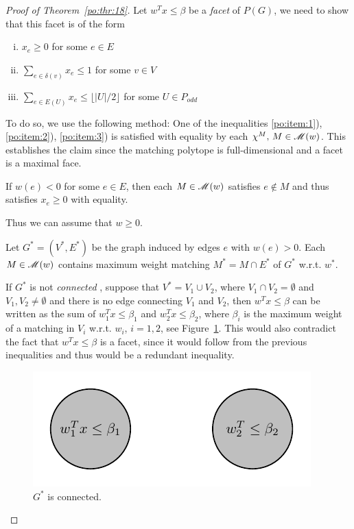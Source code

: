 \begin{proof}[Proof of Theorem~\ref{po:thr:18}]

Let $w^Tx\leq\beta$ be a \emph{facet} of $P(G)$, we need to show 
that this facet is of the form
  \begin{enumerate}[i)]
  \item $x_e\geq0$ for some $e \in E$\label{po:item:1}
  \item $\sum_{e \in \delta(v)} x_e\leq1$  for some $v \in V$\label{po:item:2}
  \item $\sum_{e \in E(U)} x_e\leq \lfloor|U|/2\rfloor$ for some $U \in P_{odd}$\label{po:item:3}
  \end{enumerate}
  
  
  To do so, we use the following method: One of the inequalities
  \ref{po:item:1}), \ref{po:item:2}), \ref{po:item:3}) is satisfied with
  equality by each $\chi^M, \,M \in \mathscr{M}(w)$. This establishes the claim
  since the matching polytope is full-dimensional and a facet is a
  maximal face. 

  




  If $w(e)<0$ for some $e \in E$, then each $M \in \mathscr{M}(w)$
  satisfies $e \notin M$ and thus satisfies $x_e\geq0$ with equality. 

  Thus we can assume that  $w\geq0$. 
  
  Let $G^*=(V^*,E^*)$ be the graph induced by edges $e$ with $w(e)>0$.  Each $M
  \in \mathscr{M}(w)$ contains maximum weight matching $M^* = M \cap E^*$ of
  $G^*$ w.r.t.  $w^*$. 

  If $G^*$ is not \emph{connected }, suppose that
  $V^*=V_1\cup V_2$, where $V_1\cap V_2 = \emptyset$ and $V_1,V_2 \neq\emptyset$ and there
  is no edge connecting $V_1$ and $V_2$, then
  $w^Tx\leq\beta$ can be written as the sum of $w_1^Tx\leq\beta_1$ and
  $w_2^Tx\leq\beta_2$, where $\beta_i$ is the maximum weight of a matching in
  $V_i$ w.r.t. $w_i$, $i=1,2$, see Figure~\ref{blobs}. This would also contradict the fact
  that $w^Tx\leq\beta$ is a facet, since it would follow from the previous
  inequalities and thus would  be a redundant
  inequality.
    
  \begin{figure}
    \centering
  
        
     \includegraphics{figures/IntProg7.pdf}
    \caption{$G^*$ is connected. }\label{blobs}
  \end{figure}
   

\end{proof}
